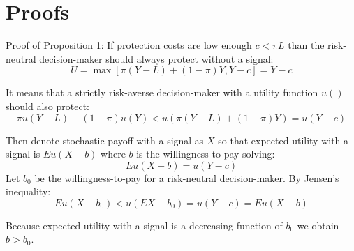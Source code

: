 \documentclass[12pt,a4paper]{article}
\begin{document}
 
\appendix
\newpage
\section{Proofs}

Proof of Proposition 1: If protection costs are low enough $c<\pi L$ than the risk-neutral decision-maker should always protect without a signal:
$$U=\max[\pi(Y-L)+(1-\pi)Y,Y-c]=Y-c$$

It means that a strictly risk-averse decision-maker with a utility function $u()$ should also protect:
$$\pi u(Y-L)+(1-\pi)u(Y)<u(\pi(Y-L)+(1-\pi)Y)=u(Y-c)$$

Then denote stochastic payoff with a signal as $X$ so that expected utility with a signal is $Eu(X-b)$ where $b$ is the willingness-to-pay solving:
$$Eu(X-b)=u(Y-c)$$
 Let $b_0$ be the willingness-to-pay for a risk-neutral decision-maker. By Jensen's inequality:
$$Eu(X-b_0)<u(EX-b_0)=u(Y-c)=Eu(X-b)$$

Because expected utility with a signal is a decreasing function of $b_0$ we obtain $b>b_0$.
\end{document}
